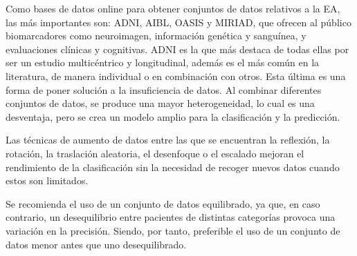 Como bases de datos online para obtener conjuntos de datos relativos a la EA, las más importantes son: ADNI, AIBL,
OASIS y MIRIAD, que ofrecen al público biomarcadores como neuroimagen, información genética y sanguínea, y evaluaciones
clínicas y cognitivas.
ADNI es la que más destaca de todas ellas por ser un estudio multicéntrico y longitudinal, además es el más común en la
literatura, de manera individual o en combinación con otros.
Esta última es una forma de poner solución a la insuficiencia de datos.
Al combinar diferentes conjuntos de datos, se produce una mayor heterogeneidad, lo cual es una desventaja, pero se crea
un modelo amplio para la clasificación y la predicción.

Las técnicas de aumento de datos entre las que se encuentran la reflexión, la rotación, la traslación aleatoria, el
desenfoque o el escalado mejoran el rendimiento de la clasificación sin la necesidad de recoger nuevos datos cuando
estos son limitados.

Se recomienda el uso de un conjunto de datos equilibrado, ya que, en caso contrario, un desequilibrio entre pacientes de
distintas categorías provoca una variación en la precisión.
Siendo, por tanto, preferible el uso de un conjunto de datos menor antes que uno desequilibrado.

